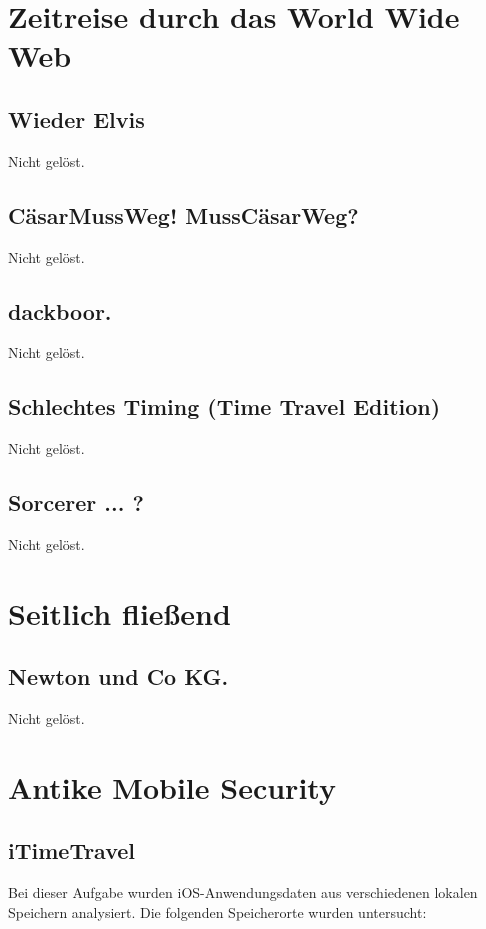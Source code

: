 \documentclass[12pt,a4paper,titlepage,oneside]{scrartcl}
\begin{document}
\section{Zeitreise durch das World Wide Web}

\subsection{Wieder Elvis}
Nicht gelöst.

\subsection{C\"asarMussWeg! MussC\"asarWeg?}
Nicht gelöst.

\subsection{dackboor.}
Nicht gelöst.

\subsection{Schlechtes Timing (Time Travel Edition)}
Nicht gelöst.

\subsection{Sorcerer ... ?}
Nicht gelöst.


\section{Seitlich fließend}

\subsection{Newton und Co KG.}
Nicht gelöst.


\section{Antike Mobile Security}

\subsection{iTimeTravel}
Bei dieser Aufgabe wurden iOS-Anwendungsdaten aus verschiedenen lokalen Speichern analysiert. Die folgenden Speicherorte wurden untersucht:
\end{document}
